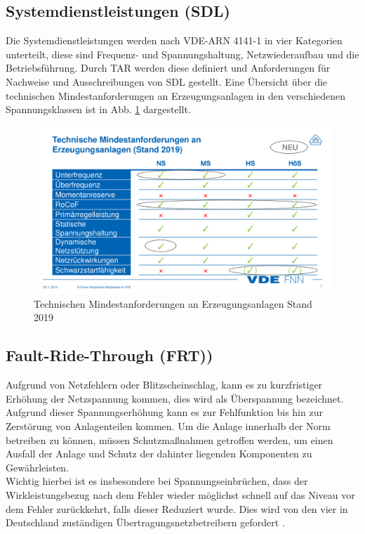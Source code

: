 	\subsection{Systemdienstleistungen (SDL)}
	Die Systemdienstleistungen werden nach VDE-ARN 4141-1 in vier Kategorien unterteilt, diese sind Frequenz- und Spannungshaltung, Netzwiederaufbau und die Betriebsführung. Durch \gls{TAR} werden diese definiert und Anforderungen für Nachweise und Ausschreibungen von \gls{SDL} gestellt. Eine Übersicht über die technischen Mindestanforderungen an Erzeugungsanlagen in den verschiedenen Spannungsklassen ist in Abb. \ref{fig:vde-fnn-tar} dargestellt.
	\begin{figure}
		\centering
		\includegraphics[width=0.9\linewidth]{content/Grafiken/VDE-FNN-TAR}
		\caption[Technischen Mindestanforderungen an Erzeugungsanlagen Stand 2019]{Technischen Mindestanforderungen an Erzeugungsanlagen Stand 2019 \cite{VDEFNN2019SDL}}
		\label{fig:vde-fnn-tar}
	\end{figure}
	
	
	
	
	\subsection{Fault-Ride-Through (FRT))}
	Aufgrund von Netzfehlern oder Blitzscheinschlag, kann es zu kurzfristiger Erhöhung der Netzspannung kommen, dies wird als Überspannung bezeichnet. Aufgrund dieser Spannungserhöhung kann es zur Fehlfunktion bis hin zur Zerstörung von Anlagenteilen kommen. Um die Anlage innerhalb der Norm betreiben zu können, müssen Schutzmaßnahmen getroffen werden, um einen Ausfall der Anlage und Schutz der dahinter liegenden Komponenten zu Gewährleisten.  \\
	
	Wichtig hierbei ist es insbesondere bei Spannungseinbrüchen, dass der Wirkleistungsbezug nach dem Fehler wieder möglichst schnell auf das Niveau vor dem Fehler zurückkehrt, falls dieser Reduziert wurde. Dies wird von den vier in Deutschland zuständigen Übertragungsnetzbetreibern gefordert \cite{4UNB}.


